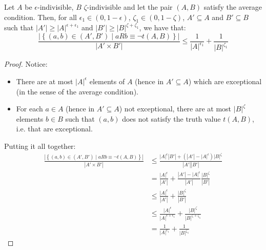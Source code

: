     \lemma[Claim 4.8]\label{exceptions_bound_of_epsilon_indivisible_sets}
        Let $A$ be $\epsilon$-indivisible, $B$ $\zeta$-indivisible and let the pair $(A,B)$ satisfy the average condition.
        Then, for all $\epsilon_1 \in \left( 0, 1-\epsilon \right)$, $\zeta_1 \in \left( 0, 1-\zeta \right)$, $A' \subseteq A$
            and $B' \subseteq B$ such that $|A'| \geq |A|^{\epsilon + \epsilon_1}$ and $|B'| \geq |B|^{\zeta + \zeta_1}$,
            we have that:
        \[
            \frac{|\left\{ (a,b) \in (A',B') \mid a R b \equiv \neg t(A,B) \right\}|}{|A' \times B'|} \leq
                \frac{1}{|A|^{\epsilon_1}} + \frac{1}{|B|^{\zeta_1}}
        \]
        \begin{proof}
            Notice:
            \begin{itemize}
                \item There are at most $|A|^\epsilon$ elements of $A$ (hence in $A' \subseteq A$) which are exceptional
                    (in the sense of the average condition).
                \item For each $a \in A$ (hence in $A' \subseteq A$) not exceptional, there are at most $|B|^\zeta$ elements
                    $b \in B$ such that $(a,b)$ does not satisfy the truth value $t(A,B)$, i.e. that are exceptional.
            \end{itemize}
            Putting it all together:
            \[
                \begin{split}
                    \frac{|\left\{ (a,b) \in (A',B') \mid a R b \equiv \neg t(A,B) \right\}|}{|A' \times B'|}
                        &\leq \frac{|A|^\epsilon |B'| + (|A'| - |A|^\epsilon) |B|^\zeta}{|A'| |B'|} \\
                        &= \frac{|A|^\epsilon}{|A'|} + \frac{|A'| - |A|^\epsilon}{|A'|} \frac{|B|^\zeta}{|B'|} \\
                        &\leq \frac{|A|^\epsilon}{|A'|} + \frac{|B|^\zeta}{|B'|} \\
                        &\leq \frac{|A|^\epsilon}{|A|^{\epsilon + \epsilon_1}} + \frac{|B|^\zeta}{|B|^{\zeta + \zeta_1}} \\
                        &= \frac{1}{|A|^{\epsilon_1}} + \frac{1}{|B|^{\zeta_1}}
                \end{split}
            \]
        \end{proof}


